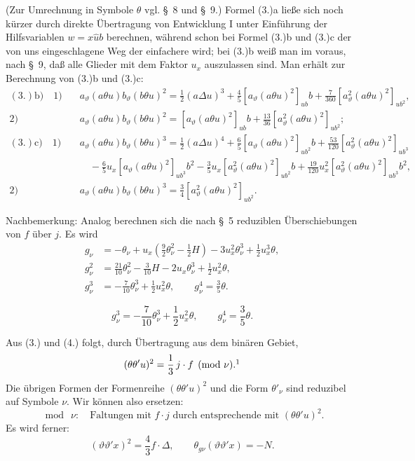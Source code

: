 \documentclass[11pt]{article}
\newcommand{\A}{\Delta}
\begin{document}
(Zur Umrechnung in Symbole $\theta$ vgl. \S\ 8 und \S\ 9.) Formel (3.)a ließe sich noch kürzer durch direkte Übertragung von Entwicklung I unter Einführung der Hilfsvariablen $w=x\widehat{u}b$ berechnen, während schon bei Formel (3.)b und (3.)c der von uns eingeschlagene Weg der einfachere wird; bei (3.)b weiß man im voraus, nach \S\ 9, daß alle Glieder mit dem Faktor $u_x$ auszulassen sind. Man erhält zur Berechnung von (3.)b und (3.)c:
\[
\begin{aligned}
(3.)\mathrm{b)}\quad 1)&\quad a_\vartheta(a\theta u)b_\vartheta(b\theta u)^2=\frac12(a\Delta u)^3+\frac45[a_\vartheta(a\theta u)^2]_{ub}b+\frac7{360}[a_\vartheta^2(a\theta u)^2]_{ub^2},\\
2)&\quad a_\vartheta(a\theta u)b_\vartheta(b\theta u)^2=[a_\vartheta(a\theta u)^2]_{ub}b+\frac{13}{36}[a_\vartheta^2(a\theta u)^2]_{ub^2};\\[.5em]
(3.)\mathrm{c)}\quad 1)&\quad a_\vartheta(a\theta u)b_\vartheta(b\theta u)^3=\frac12(a\Delta u)^4+\frac65[a_\vartheta(a\theta u)^2]_{ub^2}b+\frac{53}{120}[a_\vartheta^2(a\theta u)^2]_{ub^3}\\
&\qquad-\frac65u_x[a_\vartheta(a\theta u)^2]_{ub^3}b^2-\frac35u_x[a_\vartheta^2(a\theta u)^2]_{ub^2}b+\frac{19}{120}u_x^2[a_\vartheta^2(a\theta u)^2]_{ub^3}b^2,\\
2)&\quad a_\vartheta(a\theta u)b_\vartheta(b\theta u)^3=\frac34[a_\vartheta^2(a\theta u)^2]_{ub^2}.
\end{aligned}
\]

Nachbemerkung: Analog berechnen sich die nach \S\ 5 reduziblen Überschiebungen von $f$ über $j$. Es wird
\[
\tag{4}
\begin{aligned}
g_\nu&=-\theta_\nu+u_x\left(\frac92\theta_\nu^2-\frac12H\right)-3u_x^2\theta_\nu^3+\frac12u_x^3\theta,\\
g_\nu^2&=\frac{21}{10}\theta_\nu^2-\frac3{10}H-2u_x\theta_\nu^3+\frac12u_x^2\theta,\\
g_\nu^3&=-\frac7{10}\theta_\nu^3+\frac12u_x^2\theta,\qquad g_\nu^4=\frac35\theta.
\end{aligned}
\]




\[
\tag{4}
g_\nu^3=-\frac7{10}\theta_\nu^3+\frac12u_x^2\theta,
\qquad
g_\nu^4=\frac35\theta.
\]

Aus (3.) und (4.) folgt, durch Übertragung aus dem binären Gebiet,
\[
(\theta\theta'u)^2=\frac13\,j\cdot f\pmod{\nu}.\footnotemark
\]
Die übrigen Formen der Formenreihe $(\theta\theta'u)^2$ und die Form $\theta'_\nu$ sind reduzibel auf Symbole $\nu$. Wir können also ersetzen:
\[
\bmod\ \nu:\quad \text{Faltungen mit } f\cdot j
\text{ durch entsprechende mit }(\theta\theta'u)^2.
\]
Es wird ferner:
\[
(\vartheta\vartheta'x)^2=\frac43 f\cdot\A,
\qquad
\theta_{g\nu}(\vartheta\vartheta'x)=-N.
\]
\end{document}

